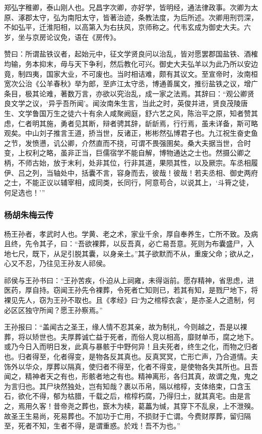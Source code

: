 \documentclass[]{article}
\begin{document}
郑弘字稚卿，泰山刚人也。兄昌字次卿，亦好学，皆明经，通法律政事。次卿为太原、涿郡太守，弘为南阳太守，皆著治迹，条教法度，为后所述。次卿用刑罚深，不如弘平，迁淮阳相，以高第入为右扶风，京师称之。代韦玄成为御史大夫。六岁，坐与京房论议免，语在《房传》。

赞曰：所谓盐铁议者，起始元中，征文学贤良问以治乱，皆对愿罢郡国盐铁、酒榷均输，务本抑末，毋与天下争利，然后教化可兴。御史大夫弘羊以为此乃所以安边竟，制四夷，国家大业，不可废也。当时相诘难，颇有其议文。至宣帝时，汝南桓宽次公治《公羊春秋》举为郎，至庐江太守丞，博通善属文，推衍盐铁之议，增广条目，极其论难，著数万言，亦欲以究治乱，成一家之法焉。其辞曰：``观公卿贤良文学之议，`异乎吾所闻'。闻汝南朱生言，当此之时，英俊并进，贤良茂陵唐生、文学鲁国万生之徒六十有余人咸聚阙庭，舒六艺之风，陈治平之原，知者赞其虑，仁者明其施，勇者见其断，辩者骋其辞，龂龂焉，行行焉，虽未详备，斯可略观矣。中山刘子推言王道，挢当世，反诸正，彬彬然弘博君子也。九江祝生奋史鱼之节，发愤懑，讥公卿，介然直而不挠，可谓不畏强圉矣。桑大夫据当世，合时变，上权利之略，虽非正当，巨儒宿学不能自解，博物通达之士也。然摄公卿之柄，不师古始，放于末利，处非其位，行非其道，果陨其性，以及厥宗。车丞相履伊、吕之列，当轴处中，括囊不言，容身而去，彼哉！彼哉！若夫丞相、御史两府之士，不能正议以辅宰相，成同类，长同行，阿意苟合，以说其上，`斗筲之徒，何足选也！'''

\hypertarget{header-n5002}{%
\subsubsection{杨胡朱梅云传}\label{header-n5002}}

杨王孙者，孝武时人也。学黄、老之术，家业千余，厚自奉养生，亡所不致。及病且终，先令其子，曰：``吾欲裸葬，以反吾真，必亡易吾意。死则为布囊盛尸，入地七尺，既下，从足引脱其囊，以身亲土。''其子欲默而不从，重废父命；欲从之，心又不忍，乃往见王孙友人祁侯。

祁侯与王孙书曰：``王孙苦疾，仆迫从上祠雍，未得诣前。愿存精神，省思虑，进医药，厚自持。窃闻王孙先令裸葬，令死者亡知则已，若其有知，是戮尸地下，将裸见先人，窃为王孙不取也。且《孝经》曰`为之棺椁衣衾'，是亦圣人之遗制，何必区区独守所闻？愿王孙察焉。''

王孙报曰：``盖闻古之圣王，缘人情不忍其亲，故为制礼，今则越之，吾是以裸葬，将以矫世也。夫厚葬诚亡益于死者，而俗人竞以相高，靡财单币，腐之地下。或乃今日入而明日发，此真与暴骸于中野何异！且夫死者，终生之化，而物之归者也。归者得至，化者得变，是物各反其真也。反真冥冥，亡形亡声，乃合道情。夫饰外以华众，厚葬以隔真，使归者不得至，化者不得变，是使物各失其所也。且吾闻之，精神者天之有也，形骸者地之有也。精神离形，各归其真，故谓之鬼，鬼之为言归也。其尸块然独处，岂有知哉？裹以币帛，隔以棺椁，支体络束，口含玉石，欲化不得，郁为枯腊，千载之后，棺椁朽腐，乃得归土，就其真宅。由是言之，焉用久客！昔帝尧之葬也，窾木为椟，葛藟为缄，其穿下不乱泉，上不泄殠。故圣王生易尚，死易葬也。不加功于亡用，不损财于亡谓。今费财厚葬，留归隔至，死者不知，生者不得，是谓重惑。於戏！吾不为也。''
\end{document}
